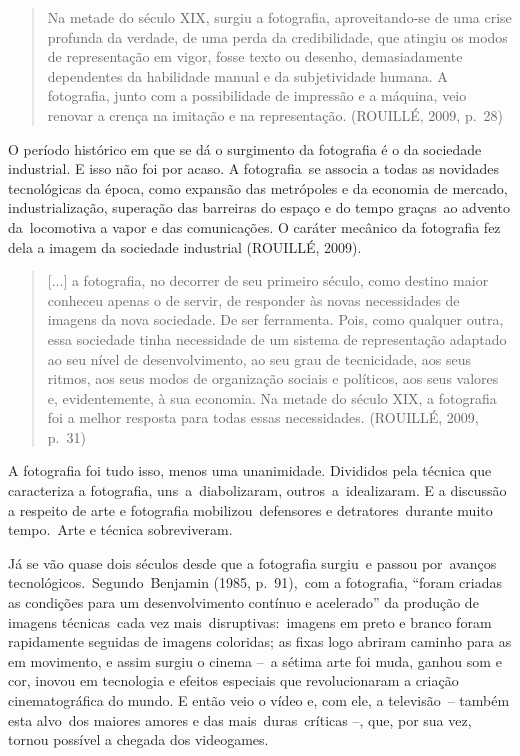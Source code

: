 \documentclass[
  letterpaper,
]{scrbook}
\begin{document}
\begin{quote}
Na metade do século XIX, surgiu a fotografia, aproveitando-se de uma
crise profunda da verdade, de uma perda da credibilidade, que atingiu os
modos de representação em vigor, fosse texto ou desenho, demasiadamente
dependentes da habilidade manual e da subjetividade humana. A
fotografia, junto com a possibilidade de impressão e a máquina, veio
renovar a crença na imitação e na representação. (ROUILLÉ, 2009, p.~28)~
\end{quote}

O período histórico em que se dá o surgimento da fotografia é o da
sociedade industrial. E isso não foi por acaso. A fotografia~se associa
a todas as novidades tecnológicas da época, como expansão das metrópoles
e da economia de mercado, industrialização, superação das barreiras do
espaço e do tempo graças~ao advento da~locomotiva a vapor e das
comunicações. O caráter mecânico da fotografia fez dela a imagem da
sociedade industrial (ROUILLÉ, 2009).~

\begin{quote}
{[}...{]} a fotografia, no decorrer de seu primeiro século, como destino
maior conheceu apenas o de servir, de responder às novas necessidades de
imagens da nova sociedade. De ser ferramenta. Pois, como qualquer outra,
essa sociedade tinha necessidade de um sistema de representação adaptado
ao seu nível de desenvolvimento, ao seu grau de tecnicidade, aos seus
ritmos, aos seus modos de organização sociais e políticos, aos seus
valores e, evidentemente, à sua economia. Na metade do século XIX, a
fotografia foi a melhor resposta para todas essas necessidades.
(ROUILLÉ, 2009, p.~31)~
\end{quote}

A fotografia foi tudo isso, menos uma unanimidade. Divididos pela
técnica que caracteriza a fotografia, uns~a~diabolizaram,
outros~a~idealizaram. E a discussão a respeito de arte e fotografia
mobilizou~defensores e detratores~durante muito tempo.~Arte e técnica
sobreviveram.~

Já se vão quase dois séculos desde que a fotografia surgiu~e passou
por~avanços tecnológicos.~Segundo~Benjamin (1985, p.~91),~com a
fotografia, ``foram criadas as condições para um desenvolvimento
contínuo e acelerado'' da produção de imagens técnicas~cada vez
mais~disruptivas:~imagens em preto e branco foram rapidamente seguidas
de imagens coloridas; as fixas logo abriram caminho para as em
movimento, e assim surgiu o cinema --~a sétima arte foi muda, ganhou som
e cor, inovou em tecnologia e efeitos especiais que revolucionaram a
criação cinematográfica do mundo. E então veio o vídeo e, com ele, a
televisão~-- também esta alvo~dos maiores amores e das
mais~duras~críticas --, que, por sua vez, tornou possível a chegada dos
videogames.
\end{document}
